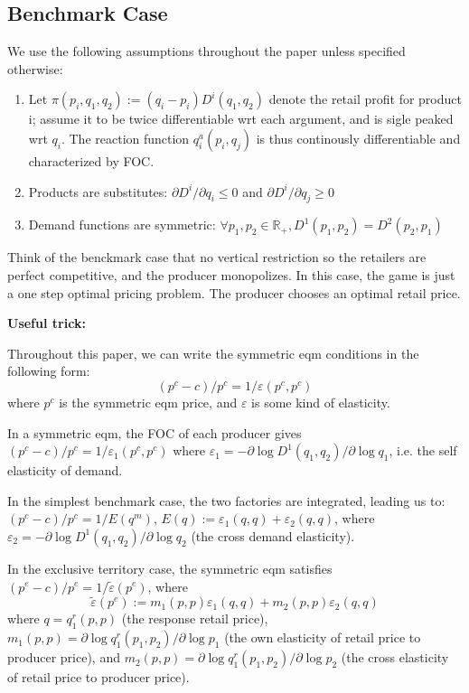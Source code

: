 \documentclass{book}
\theoremstyle{plain}
\theoremstyle{definition}
\newcommand{\R}{\mathbb{R}}			%
\begin{document}
\subsection{Benchmark Case} %
\label{sub:benchmark}

We use the following assumptions throughout the paper unless specified otherwise:

\begin{enumerate}
	\item Let $\pi(p_i,q_1,q_2) := (q_i-p_i)D^i(q_1,q_2)$ denote the retail profit for product i; assume it to be twice differentiable wrt each argument, and is sigle peaked wrt $q_i$. The reaction function $q_i^a(p_i,q_j)$ is thus continously differentiable and characterized by FOC.
	\item Products are substitutes: $\partial D^i/\partial q_i \leq 0$ and $\partial D^i/\partial q_j \geq 0$
	\item Demand functions are symmetric: $\forall p_1,p_2 \in \R_+, D^1(p_1,p_2) = D^2(p_2,p_1)$
\end{enumerate}

Think of the benckmark case that no vertical restriction so the retailers are perfect competitive, and the producer monopolizes. In this case, the game is just a one step optimal pricing problem. The producer chooses an optimal retail price.\\

\begin{mdframed}[style=comment]

\noindent
\textbf{Useful trick:}

Throughout this paper, we can write the symmetric eqm conditions in the following form:
\[(p^c - c)/p^c=1/\varepsilon(p^c,p^c)\]
where $p^c$ is the symmetric eqm price, and $\varepsilon$ is some kind of elasticity.

In a symmetric eqm, the FOC of each producer gives 
\((p^c - c)/p^c=1/\varepsilon_1(p^c,p^c)\)
where $\varepsilon_1 = -\partial \log D^1(q_1,q_2)/\partial \log q_1$, i.e. the self elasticity of demand.

In the simplest benchmark case, the two factories are integrated, leading us to:
\((p^c - c)/p^c=1/E(q^m)\),
$E(q):=\varepsilon_1(q,q)+\varepsilon_2(q,q)$, where $\varepsilon_2 = -\partial \log D^1(q_1,q_2)/\partial \log q_2$ (the cross demand elasticity).

In the exclusive territory case, the symmetric eqm satisfies \((p^e - c)/p^e=1/\tilde\varepsilon(p^e)\), where 
\[\tilde\varepsilon(p^e):=m_1(p,p)\varepsilon_1(q,q)+m_2(p,p)\varepsilon_2(q,q) \]
where $q=q_1^r(p,p)$ (the response retail price),
$m_1(p,p)=\partial \log q_1^r(p_1,p_2)/\partial \log p_1$ (the own elasticity of retail price to producer price),
and  $m_2(p,p)=\partial \log q_1^r(p_1,p_2)/\partial \log p_2$ (the cross elasticity of retail price to producer price).

\end{mdframed}
\end{document}
